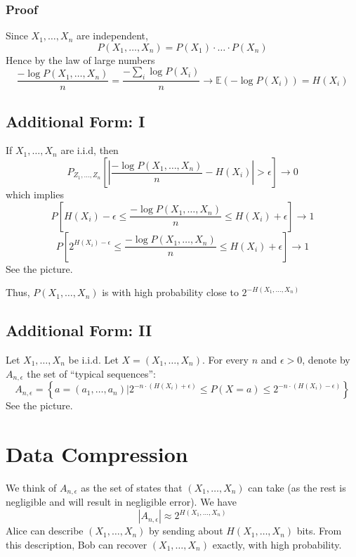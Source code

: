 \documentclass{article}
\begin{document}
\subsubsection{Proof}

Since $X_1,\ldots,X_n$ are independent,
\[
P(X_1,\ldots,X_n)=P(X_1)\cdot\ldots\cdot P(X_n)
\]
Hence by the law of large numbers 
\[
\frac{-\log P(X_1,\ldots, X_n)}{n}  = \frac{-\sum_i \log P(X_i)}{n}\to \mathbb{E}\left(-\log P(X_i)\right)=H(X_i)
\]

\subsection{Additional Form: I}

If $X_1,\ldots, X_n$ are i.i.d, then 
\[
P_{Z_1,\ldots,Z_n}\left[ | \frac{-\log P(X_1,\ldots, X_n)}{n} - H(X_i) |>\epsilon \right] \to 0
\]
which implies 
\[
P\left[ H(X_i)-\epsilon \leq \frac{-\log P(X_1,\ldots, X_n)}{n} \leq H(X_i) + \epsilon \right] \to 1
\]
\[
P\left[ 2^{H(X_i)-\epsilon} \leq \frac{-\log P(X_1,\ldots, X_n)}{n} \leq H(X_i) + \epsilon \right] \to 1
\]
See the picture.

Thus, $P(X_1,\ldots,X_n)$ is with high probability close to $2^{-H\left(X_1,\ldots,X_n\right)}$

\subsection{Additional Form: II}

Let $X_1,\ldots,X_n$ be i.i.d. Let $X=\left(X_1,\ldots,X_n\right)$. For every $n$ and $\epsilon>0$, denote by $A_{n,\epsilon}$ the set of ``typical sequences'':
\[
A_{n,\epsilon}=\left\{a=\left(a_1,\ldots, a_n\right)\Big| 2^{-n\cdot \left(H(X_i) + \epsilon\right)}\leq P(X=a) \leq 2^{-n\cdot \left(H(X_i)-\epsilon\right)}\right\}
\]
See the picture.

\section{Data Compression}

We think of $A_{n,\epsilon}$ as the set of states that $\left(X_1,\ldots,X_n\right)$ can take (as the rest is negligible and will result in negligible error). We have 
\[
| A_{n,\epsilon} | \approx 2^{H(X_1,\ldots,X_n)}
\]
Alice can describe $\left(X_1,\ldots, X_n\right)$ by sending about $H(X_1,\ldots, X_n)$ bits. From this description, Bob can recover $\left(X_1,\ldots, X_n\right)$ exactly, with high probability.
\end{document}
